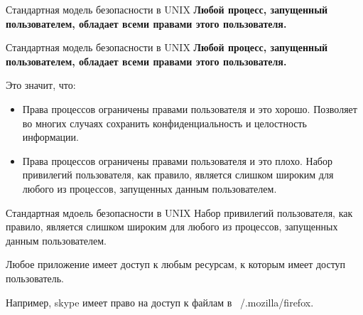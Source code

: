 \documentclass{beamer}
\begin{document}
\begin{frame}[fragile]{Стандартная модель безопасности в UNIX}
\bfseries{Любой процесс, запущенный пользователем, обладает всеми правами этого пользователя.}

\begin{center}
\end{center}
\end{frame}

\begin{frame}[fragile]{Стандартная модель безопасности в UNIX}
\bfseries{Любой процесс, запущенный пользователем, обладает всеми правами этого пользователя.}

\begin{block}{Это значит, что:}

\begin{itemize}
\item Права процессов ограничены правами пользователя и это хорошо.
        Позволяет во многих случаях
        сохранить конфиденциальность и целостность информации.

\item Права процессов ограничены правами пользователя и это плохо.
        Набор привилегий пользователя, как правило, является слишком
        широким для любого из процессов, запущенных данным пользователем.

\end{itemize}
\end{block}

\end{frame}

\begin{frame}[fragile]{Стандартная мдоель безопасности в UNIX}
Набор привилегий пользователя, как правило, является слишком
широким для любого из процессов, запущенных данным пользователем.

\bigskip

Любое приложение имеет доступ к любым ресурсам, к которым имеет доступ
пользователь.

\bigskip

Например, skype имеет право на доступ к файлам в ~/.mozilla/firefox.

\end{frame}
\end{document}
